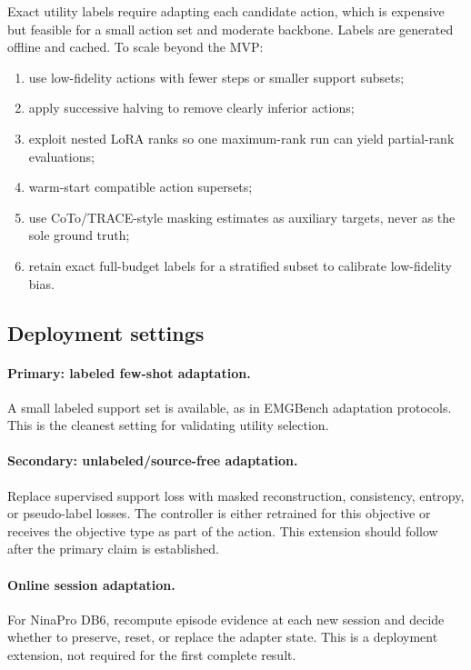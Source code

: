 \documentclass[10pt]{article}
\begin{document}
Exact utility labels require adapting each candidate action, which is expensive but feasible for a small action set and moderate backbone. Labels are generated offline and cached. To scale beyond the MVP:
\begin{enumerate}[leftmargin=*, itemsep=1pt]
    \item use low-fidelity actions with fewer steps or smaller support subsets;
    \item apply successive halving to remove clearly inferior actions;
    \item exploit nested LoRA ranks so one maximum-rank run can yield partial-rank evaluations;
    \item warm-start compatible action supersets;
    \item use CoTo/TRACE-style masking estimates as auxiliary targets, never as the sole ground truth;
    \item retain exact full-budget labels for a stratified subset to calibrate low-fidelity bias.
\end{enumerate}

\subsection{Deployment settings}

\paragraph{Primary: labeled few-shot adaptation.} A small labeled support set is available, as in EMGBench adaptation protocols. This is the cleanest setting for validating utility selection.

\paragraph{Secondary: unlabeled/source-free adaptation.} Replace supervised support loss with masked reconstruction, consistency, entropy, or pseudo-label losses. The controller is either retrained for this objective or receives the objective type as part of the action. This extension should follow after the primary claim is established.

\paragraph{Online session adaptation.} For NinaPro DB6, recompute episode evidence at each new session and decide whether to preserve, reset, or replace the adapter state. This is a deployment extension, not required for the first complete result.
\end{document}
